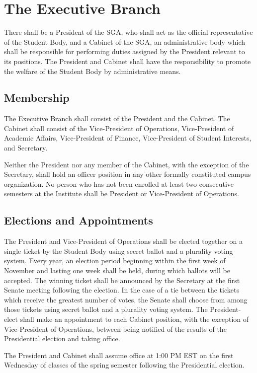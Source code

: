 \documentclass[12pt,oneside]{scrreprt}
\begin{document}
\chapter{The Executive Branch}
There shall be a President of the SGA, who shall act as the official representative of the Student Body, and a Cabinet of the SGA, an administrative body which shall be responsible for performing duties assigned by the President relevant to its positions. The President and Cabinet shall have the responsibility to promote the welfare of the Student Body by administrative means.

\section{Membership}
The Executive Branch shall consist of the President and the Cabinet. The Cabinet shall consist of the Vice-President of Operations, Vice-President of Academic Affairs, Vice-President of Finance, Vice-President of Student Interests, and Secretary. 

Neither the President nor any member of the Cabinet, with the exception of the Secretary, shall hold an officer position in any other formally constituted campus organization. No person who has not been enrolled at least two consecutive semesters at the Institute shall be President or Vice-President of Operations.

\section{Elections and Appointments}
The President and Vice-President of Operations shall be elected together on a single ticket by the Student Body using secret ballot and a plurality voting system. Every year, an election period beginning within the first week of November and lasting one week shall be held, during which ballots will be accepted. The winning ticket shall be announced by the Secretary at the first Senate meeting following the election. In the case of a tie between the tickets which receive the greatest number of votes, the Senate shall choose from among those tickets using secret ballot and a plurality voting system. The President-elect shall make an appointment to each Cabinet position, with the exception of Vice-President of Operations, between being notified of the results of the Presidential election and taking office.

The President and Cabinet shall assume office at 1:00 PM EST on the first Wednesday of classes of the spring semester following the Presidential election.
\end{document}
